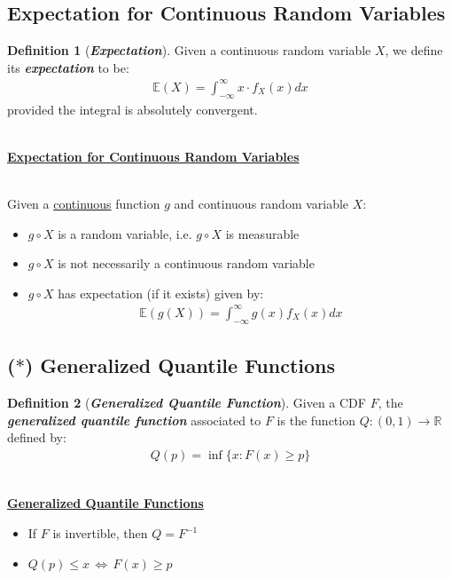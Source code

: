 \documentclass[12pt]{extarticle}
\newcommand{\pstart}[0]{\noindent}
\newcommand{\newp}[0]{~\\\pstart}
\newcommand{\term}[1]{\textbf{\textit{#1}}}
\newcommand{\titleul}[1]{\pstart\textbf{\ul{#1}}}
\theoremstyle{definition}
\newtheorem*{definition}{Definition}
\theoremstyle{remark}
\newcommand{\expected}[1]{\mathbb{E}\left(#1\right)}
\begin{document}
\subsection{Expectation for Continuous Random Variables}
\begin{tcolorbox}[colback=blue!5!white]
    \begin{definition}[\term{Expectation}]
        Given a continuous random variable $X$, we define its 
\term{expectation} to be: \begin{align*}
            \expected{X}=\int_{-\infty}^\infty x\cdot f_X(x)dx
        \end{align*}
        provided the integral is absolutely convergent.
    \end{definition}
\end{tcolorbox}

\newp
\titleul{Expectation for Continuous Random Variables}

\newp
Given a \ul{continuous} function $g$ and continuous random variable $X$: 
\begin{itemize}
        \item $g\circ X$ is a random variable, i.e. $g\circ X$ is 
measurable
        \item $g\circ X$ is not necessarily a continuous random variable
        \item $g\circ X$ has expectation (if it exists) given by: 
\begin{align*}
        \expected{g(X)}=\int_{-\infty}^\infty g(x)f_X(x)dx
    \end{align*}
    \end{itemize}


\subsection{($\ast$) Generalized Quantile Functions}
\begin{definition}[\term{Generalized Quantile Function}]
    Given a CDF $F$, the \term{generalized quantile function} associated 
to $F$ is the function $Q:(0,1)\to\mathbb{R}$ defined by: \begin{align*}
        Q(p)=\inf\{x:F(x)\geq p\}
    \end{align*}
\end{definition}

\newp
\titleul{Generalized Quantile Functions}
\begin{itemize}
    \item If $F$ is invertible, then $Q=F^{-1}$
    \item $Q(p)\leq x\,\Leftrightarrow\,F(x)\geq p$
\end{itemize}
\end{document}
